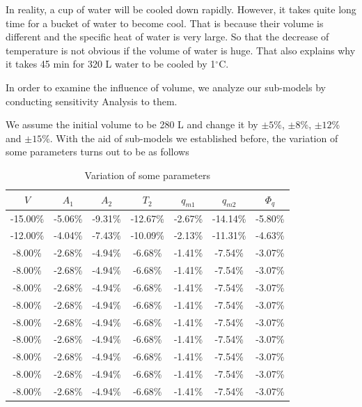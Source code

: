 \documentclass{mcmthesis}
\begin{document}
In reality, a cup of water will be cooled down rapidly. However, it takes quite long time for a bucket of water to become cool. That is because their volume is different and the specific heat of water is very large. So that the decrease of temperature is not obvious if the volume of water is huge. That also explains why it takes 45 min for 320 L water to be cooled by 1$^\circ$C.

In order to examine the influence of volume, we analyze our sub-models
by conducting sensitivity Analysis to them.

We assume the initial volume to be 280 L and change it by $\pm 5$\%, $\pm 8$\%, $\pm 12$\% and $\pm 15$\%. With the aid of sub-models we established before, the variation of some parameters turns out to be as follows

\begin{table}[h] %
\centering  %
\caption{Variation of some parameters}  %
\label{tab7} %
\begin{tabular}{ccccccc} %
\toprule  %
$V$      & $A_1$   & $A_2$   & $T_2$    & $q_{m1}$ & $q_{m2}$ & $\Phi_q$ \\
\midrule  %
-15.00\% & -5.06\% & -9.31\% & -12.67\% & -2.67\%  & -14.14\% & -5.80\% \\
-12.00\% & -4.04\% & -7.43\% & -10.09\% & -2.13\%  & -11.31\% & -4.63\% \\
-8.00\%  & -2.68\% & -4.94\% & -6.68\%  & -1.41\%  & -7.54\%  & -3.07\% \\
-8.00\%  & -2.68\% & -4.94\% & -6.68\%  & -1.41\%  & -7.54\%  & -3.07\% \\
-8.00\%  & -2.68\% & -4.94\% & -6.68\%  & -1.41\%  & -7.54\%  & -3.07\% \\
-8.00\%  & -2.68\% & -4.94\% & -6.68\%  & -1.41\%  & -7.54\%  & -3.07\% \\
-8.00\%  & -2.68\% & -4.94\% & -6.68\%  & -1.41\%  & -7.54\%  & -3.07\% \\
-8.00\%  & -2.68\% & -4.94\% & -6.68\%  & -1.41\%  & -7.54\%  & -3.07\% \\
-8.00\%  & -2.68\% & -4.94\% & -6.68\%  & -1.41\%  & -7.54\%  & -3.07\% \\
-8.00\%  & -2.68\% & -4.94\% & -6.68\%  & -1.41\%  & -7.54\%  & -3.07\% \\
-8.00\%  & -2.68\% & -4.94\% & -6.68\%  & -1.41\%  & -7.54\%  & -3.07\% \\
\bottomrule  %
\end{tabular}
\end{table}
\end{document}
